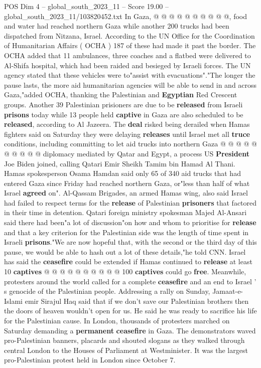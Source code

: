 \begin{textsample}{POS Dim 4 – global\_south\_2023\_11 – Score 19.00 – global\_south\_2023\_11/103820452.txt}
In Gaza, @ @ @ @ @ @ @ @ @ @, food and water had reached northern Gaza while another 200 trucks had been dispatched from Nitzana, Israel.
According to the UN Office for the Coordination of Humanitarian Affairs ( OCHA ) 187 of these had made it past the border.
The OCHA added that 11 ambulances, three coaches and a flatbed were delivered to Al-Shifa hospital, which had been raided and besieged by Israeli forces.
The UN agency stated that these vehicles were to"assist with evacuations"."The longer the pause lasts, the more aid humanitarian agencies will be able to send in and across Gaza,"added OCHA, thanking the Palestinian and \textbf{Egyptian} Red Crescent groups.
Another 39 Palestinian prisioners are due to be \textbf{released} from Israeli \textbf{prisons} today while 13 people held \textbf{captive} in Gaza are also scheduled to be \textbf{released}, according to Al Jazeera.
The \textbf{deal} risked being derailed when Hamas fighters said on Saturday they were delaying \textbf{releases} until Israel met all \textbf{truce} conditions, including committing to let aid trucks into northern Gaza @ @ @ @ @ @ @ @ @ @ diplomacy mediated by Qatar and Egypt, a process US \textbf{President} Joe Biden joined, calling Qatari Emir Sheikh Tamim bin Hamad Al Thani.
Hamas spokesperson Osama Hamdan said only 65 of 340 aid trucks that had entered Gaza since Friday had reached northern Gaza, or"less than half of what Israel \textbf{agreed} on".
Al-Qassam Brigades, an armed Hamas wing, also said Israel had failed to respect terms for the \textbf{release} of Palestinian \textbf{prisoners} that factored in their time in detention.
Qatari foreign ministry spokesman Majed Al-Ansari said there had been"a lot of discussion"on how and whom to prioritise for \textbf{release} and that a key criterion for the Palestinian side was the length of time spent in Israeli \textbf{prisons}."We are now hopeful that, with the second or the third day of this pause, we would be able to hash out a lot of these details,"he told CNN.
Israel has said the \textbf{ceasefire} could be extended if Hamas continued to \textbf{release} at least 10 \textbf{captives} @ @ @ @ @ @ @ @ @ @ 100 \textbf{captives} could go \textbf{free}.
Meanwhile, protesters around the world called for a complete \textbf{ceasefire} and an end to Israel ' s genocide of the Palestinian people.
Addressing a rally on Sunday, Jamaat-e-Islami emir Sirajul Haq said that if we don't save our Palestinian brothers then the doors of heaven wouldn't open for us.
He said he was ready to sacrifice his life for the Palestinian cause.
In London, thousands of protesters marched on Saturday demanding a \textbf{permanent} \textbf{ceasefire} in Gaza.
The demonstrators waved pro-Palestinian banners, placards and shouted slogans as they walked through central London to the Houses of Parliament at Westminister.
It was the largest pro-Palestinian protest held in London since October 7.

\end{textsample}
